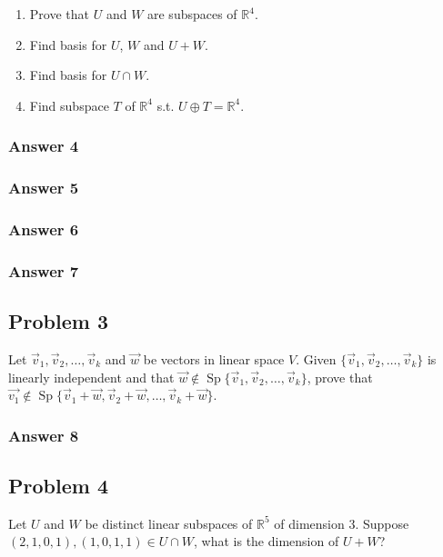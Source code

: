\documentclass[11pt]{article}
\DeclareMathOperator{\Sp}{Sp}
\begin{document}
\begin{enumerate}
\item Prove that $U$ and $W$ are subspaces of $\mathbb{R}^4$.
\item Find basis for $U$, $W$ and $U+W$.
\item Find basis for $U \cap W$.
\item Find subspace $T$ of $\mathbb{R}^4$ s.t. $U \oplus T = \mathbb{R}^4$.
\end{enumerate}

\subsubsection{Answer 4}
\label{sec-1-2-1}

\subsubsection{Answer 5}
\label{sec-1-2-2}

\subsubsection{Answer 6}
\label{sec-1-2-3}

\subsubsection{Answer 7}
\label{sec-1-2-4}

\subsection{Problem 3}
\label{sec-1-3}
Let $\vec{v}_1, \vec{v}_2, \dots, \vec{v}_k$ and $\vec{w}$ be vectors in
linear space $V$.  Given $\{\vec{v}_1, \vec{v}_2, \dots, \vec{v}_k\}$ is
linearly independent and that $\vec{w} \not \in \Sp\{\vec{v}_1, \vec{v}_2,
   \dots, \vec{v}_k\}$, prove that $\vec{v_1} \not \in \Sp\{\vec{v}_1 + \vec{w},
   \vec{v}_2 + \vec{w}, \dots, \vec{v}_k + \vec{w}\}$.

\subsubsection{Answer 8}
\label{sec-1-3-1}

\subsection{Problem 4}
\label{sec-1-4}
Let $U$ and $W$ be distinct linear subspaces of $\mathbb{R}^5$ of
dimension 3.  Suppose $(2, 1, 0, 1), (1, 0, 1, 1) \in U \cap W$, what is the
dimension of $U + W$?
\end{document}
